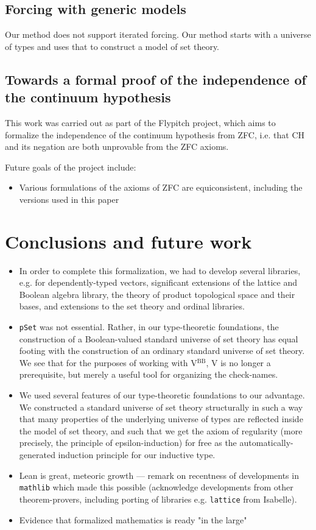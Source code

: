 \documentclass[a4paper,USenglish,cleveref, autoref]{lipics-v2019}
\begin{document}
\subsection{Forcing with generic models}

Our method does not support iterated forcing. Our method starts with a universe of types and uses that to construct a model of set theory.
\subsection{Towards a formal proof of the independence of the continuum hypothesis}


This work was carried out as part of the Flypitch project, which aims to formalize the independence of the continuum hypothesis from ZFC, i.e. that CH and its negation are both unprovable from the ZFC axioms.

Future goals of the project include:

\begin{itemize}
\item Various formulations of the axioms of ZFC are equiconsistent, including the versions used in this paper
\end{itemize}
\section{Conclusions and future work}

\begin{itemize}
\item In order to complete this formalization, we had to develop several libraries, e.g. for dependently-typed vectors, significant extensions of the lattice and Boolean algebra library, the theory of product topological space and their bases, and extensions to the set theory and ordinal libraries.
  
\item \texttt{pSet} was not essential. Rather, in our type-theoretic foundations, the construction of a Boolean-valued standard universe of set theory has equal footing with the construction of an ordinary standard universe of set theory. We see that for the purposes of working with V\(^{\text{BB}}\), V is no longer a prerequisite, but merely a useful tool for organizing the check-names.
\item We used several features of our type-theoretic foundations to our advantage. We constructed a standard universe of set theory structurally in such a way that many properties of the underlying universe of types are reflected inside the model of set theory, and such that we get the axiom of regularity (more precisely, the principle of epsilon-induction) for free as the automatically-generated induction principle for our inductive type.
\item Lean is great, meteoric growth --- remark on recentness of developments in \texttt{mathlib} which made this possible (acknowledge developments from other theorem-provers, including porting of libraries e.g. \texttt{lattice} from Isabelle).
\item Evidence that formalized mathematics is ready "in the large"
\end{itemize}
\end{document}
